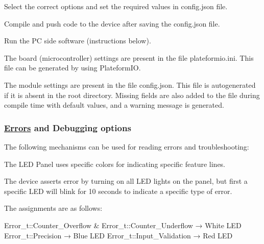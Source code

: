 \begin{DoxyEnumerate}
\item Select the correct options and set the required values in {\ttfamily config.\+json} file.
\item Compile and push code to the device after saving the {\ttfamily config.\+json} file.
\item Run the PC side software (instructions below). 


\end{DoxyEnumerate}
\begin{DoxyItemize}
\item The board (microcontroller) settings are present in the file {\ttfamily plateformio.\+ini}. This file can be generated by using {\ttfamily Plateform\+IO}.
\item The module settings are present in the file {\ttfamily config.\+json}. This file is autogenerated if it is absent in the root directory. Missing fields are also added to the file during compile time with default values, and a warning message is generated.
\end{DoxyItemize}

\subsubsection*{\hyperlink{classErrors}{Errors} and Debugging options}

The following mechanisms can be used for reading errors and troubleshooting\+:


\begin{DoxyItemize}
\item The L\+ED Panel uses specific colors for indicating specific feature lines.
\item The device asserts error by turning on all L\+ED lights on the panel, but first a specific L\+ED will blink for 10 seconds to indicate a specific type of error.

The assignments are as follows\+:
\end{DoxyItemize}


\begin{DoxyCode}
Error\_t::Counter\_Overflow & Error\_t::Counter\_Underflow → White LED
Error\_t::Precision → Blue LED
Error\_t::Input\_Validation → Red LED
\end{DoxyCode}



